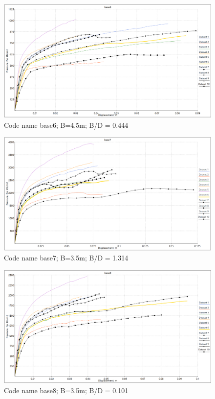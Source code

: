 \documentclass[a4paper, nobind]{templates/ociamthesis}
\begin{document}
\begin{figure}[H]
\includegraphics[width=1\linewidth]{myfigureeeeee/BASE6} \caption{Code name base6; B=4.5m; B/D = 0.444}\label{fig:unnamed-chunk-41}
\end{figure}

\begin{figure}[H]
\includegraphics[width=1\linewidth]{myfigureeeeee/BASE7} \caption{Code name base7; B=3.5m; B/D = 1.314}\label{fig:unnamed-chunk-42}
\end{figure}

\begin{figure}[H]
\includegraphics[width=1\linewidth]{myfigureeeeee/BASE8} \caption{Code name base8; B=3.5m; B/D = 0.101}\label{fig:unnamed-chunk-43}
\end{figure}
\end{document}
